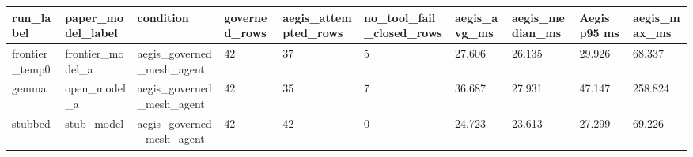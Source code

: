 \begin{tabular}{llllllllll}
 \hline
run\_label & paper\_model\_label & condition & governed\_rows & aegis\_attempted\_rows & no\_tool\_fail\_closed\_rows & aegis\_avg\_ms & aegis\_median\_ms & Aegis p95 ms & aegis\_max\_ms \\
 \hline
frontier\_temp0 & frontier\_model\_a & aegis\_governed\_mesh\_agent & 42 & 37 & 5 & 27.606 & 26.135 & 29.926 & 68.337 \\
gemma & open\_model\_a & aegis\_governed\_mesh\_agent & 42 & 35 & 7 & 36.687 & 27.931 & 47.147 & 258.824 \\
stubbed & stub\_model & aegis\_governed\_mesh\_agent & 42 & 42 & 0 & 24.723 & 23.613 & 27.299 & 69.226 \\
 \hline
\end{tabular}
